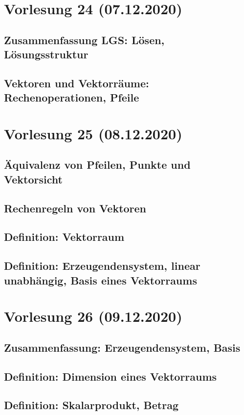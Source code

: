 \documentclass[]{article}
\begin{document}
\section{Vorlesung 24 (07.12.2020)}
\subsection{Zusammenfassung LGS: Lösen, Lösungsstruktur}
\subsection{Vektoren und Vektorräume: Rechenoperationen, Pfeile}


\section{Vorlesung 25 (08.12.2020)}
\subsection{Äquivalenz von Pfeilen, Punkte und Vektorsicht}
\subsection{Rechenregeln von Vektoren}
\subsection{Definition: Vektorraum}
\subsection{Definition: Erzeugendensystem, linear unabhängig, Basis eines Vektorraums}


\section{Vorlesung 26 (09.12.2020)}
\subsection{Zusammenfassung: Erzeugendensystem, Basis}
\subsection{Definition: Dimension eines Vektorraums}
\subsection{Definition: Skalarprodukt, Betrag}
\end{document}

